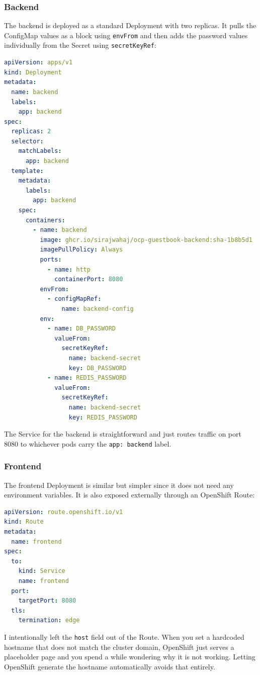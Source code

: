 \subsubsection{Backend}

The backend is deployed as a standard Deployment with two replicas. It pulls the
ConfigMap values as a block using \texttt{envFrom} and then adds the password values
individually from the Secret using \texttt{secretKeyRef}:

\begin{lstlisting}[language=yaml]
apiVersion: apps/v1
kind: Deployment
metadata:
  name: backend
  labels:
    app: backend
spec:
  replicas: 2
  selector:
    matchLabels:
      app: backend
  template:
    metadata:
      labels:
        app: backend
    spec:
      containers:
        - name: backend
          image: ghcr.io/sirajwahaj/ocp-guestbook-backend:sha-1b8b5d1
          imagePullPolicy: Always
          ports:
            - name: http
              containerPort: 8080
          envFrom:
            - configMapRef:
                name: backend-config
          env:
            - name: DB_PASSWORD
              valueFrom:
                secretKeyRef:
                  name: backend-secret
                  key: DB_PASSWORD
            - name: REDIS_PASSWORD
              valueFrom:
                secretKeyRef:
                  name: backend-secret
                  key: REDIS_PASSWORD
\end{lstlisting}

The Service for the backend is straightforward and just routes traffic on port 8080 to
whichever pods carry the \texttt{app: backend} label.

\subsubsection{Frontend}

The frontend Deployment is similar but simpler since it does not need any environment
variables. It is also exposed externally through an OpenShift Route:

\begin{lstlisting}[language=yaml]
apiVersion: route.openshift.io/v1
kind: Route
metadata:
  name: frontend
spec:
  to:
    kind: Service
    name: frontend
  port:
    targetPort: 8080
  tls:
    termination: edge
\end{lstlisting}

I intentionally left the \texttt{host} field out of the Route. When you set a hardcoded
hostname that does not match the cluster domain, OpenShift just serves a placeholder
page and you spend a while wondering why it is not working. Letting OpenShift generate
the hostname automatically avoids that entirely.

